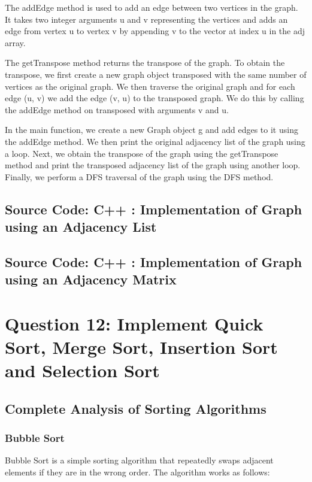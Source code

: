 \documentclass[a4paper]{article}
\begin{document}
The addEdge method is used to add an edge between two vertices in the graph. It takes two integer arguments u and v representing the vertices and adds an edge from vertex u to vertex v by appending v to the vector at index u in the adj array.

The getTranspose method returns the transpose of the graph. To obtain the transpose, we first create a new graph object transposed with the same number of vertices as the original graph. We then traverse the original graph and for each edge (u, v) we add the edge (v, u) to the transposed graph. We do this by calling the addEdge method on transposed with arguments v and u.

In the main function, we create a new Graph object g and add edges to it using the addEdge method. We then print the original adjacency list of the graph using a loop. Next, we obtain the transpose of the graph using the getTranspose method and print the transposed adjacency list of the graph using another loop. Finally, we perform a DFS traversal of the graph using the DFS method.


\subsection{Source Code: C++ : Implementation of Graph using an Adjacency List}

\subsection{Source Code: C++ : Implementation of Graph using an Adjacency Matrix}




\pagebreak







\section{\hspace{-0.5em}\textbf{ Question 12}: Implement Quick Sort, Merge Sort, Insertion Sort and Selection Sort}


\subsection{Complete Analysis of Sorting Algorithms}

\subsubsection{Bubble Sort}
Bubble Sort is a simple sorting algorithm that repeatedly swaps adjacent elements if they are in the wrong order. The algorithm works as follows:
\end{document}
